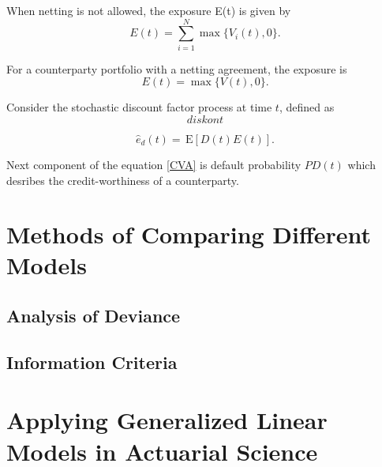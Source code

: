 \documentclass{amsart}
\theoremstyle{definition}\newtheorem{definition}[theorem]{Definition}
\theoremstyle{remark}\newtheorem{remark}[theorem]{Remark}
\newcommand{\E}{\,\mathrm{E}}
\begin{document}
When netting is not allowed, the exposure E(t) is given by
\begin{equation}
E(t)=\sum_{i=1}^N\max\{V_i(t),0\}.
\end{equation}

For a counterparty portfolio with a netting agreement, the exposure is
\begin{equation}
E(t)=\max\{V(t),0\}.
\end{equation}

Consider the stochastic discount factor process at time $t$, defined as 
\begin{equation}
diskont
\end{equation}

\begin{equation}
\hat{e}_d(t)=\E[D(t) E(t)].
\end{equation}

Next component of the equation \eqref{CVA} is default probability $PD(t)$ which desribes the credit-worthiness of a counterparty. 


\section{Methods of Comparing Different Models}

\subsection{Analysis of Deviance}

\subsection{Information Criteria}
\section{Applying Generalized Linear Models in Actuarial Science}
\end{document}
